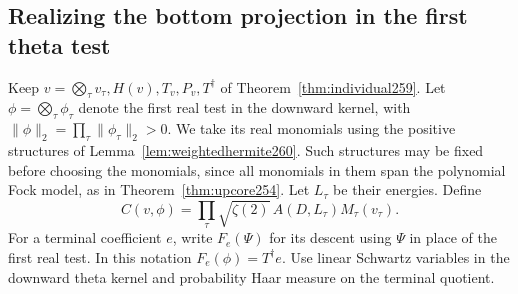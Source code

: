 \documentclass[a4paper,11pt]{article}
\theoremstyle{definition}
\theoremstyle{remark}
\numberwithin{equation}{section}
\begin{document}
\subsection{Realizing the bottom projection in the first theta test}\label{nav:III-44}
Keep \(v=\bigotimes_\tau v_\tau,H(v),T_v,P_v,T^\dagger\) of
Theorem~\ref{thm:individual259}. Let \(\phi=\bigotimes_\tau\phi_\tau\)
denote the first real test in the downward kernel, with
\(\|\phi\|_2=\prod_\tau\|\phi_\tau\|_2>0\). We take its real
monomials using the positive structures of
Lemma~\ref{lem:weightedhermite260}. Such structures may be fixed
before choosing the monomials, since all monomials in them span
the polynomial Fock model, as in Theorem~\ref{thm:upcore254}.
Let \(L_\tau\) be their energies. Define
\[
 C(v,\phi)=\prod_\tau
    \sqrt{\zeta(2)}\,A(D,L_\tau)M_\tau(v_\tau).
\]
For a terminal coefficient \(e\), write \(F_e(\Psi)\) for its
descent using \(\Psi\) in place of the first real test. In this
notation \(F_e(\phi)=T^\dagger e\). Use linear Schwartz variables
in the downward theta kernel and probability Haar measure on the
terminal quotient.
\end{document}
